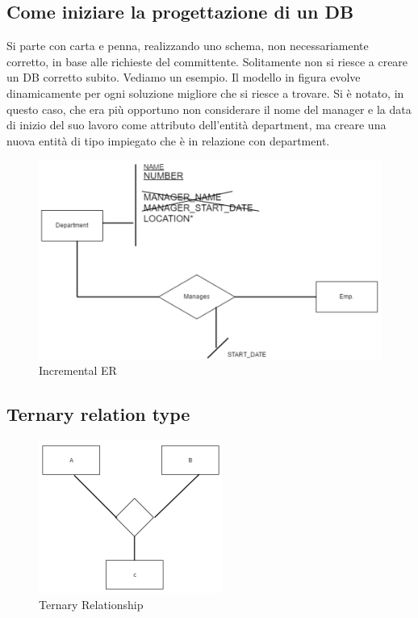 \subsection{Come iniziare la progettazione di un DB}

Si parte con carta e penna, realizzando uno schema, non necessariamente corretto, in base alle richieste del committente. Solitamente non si riesce a creare un DB corretto subito. Vediamo un esempio.  
Il modello in figura evolve dinamicamente per ogni soluzione migliore che si riesce a trovare. 
Si è notato, in questo caso, che era più opportuno non considerare il nome del manager e la data di inizio del suo lavoro come attributo dell’entità department, ma creare una nuova entità di tipo impiegato che è in relazione con department.

\begin{center}
\begin{figure}[H]
\centering
\includegraphics[scale=1]{figures/incER.png}
\caption{Incremental ER} 
\end{figure}
\end{center}

\subsection{Ternary relation type}

\begin{center}
\begin{figure}[H]
\centering
\includegraphics[scale=1]{figures/tER.png}
\caption{Ternary Relationship} 
\end{figure}
\end{center}

